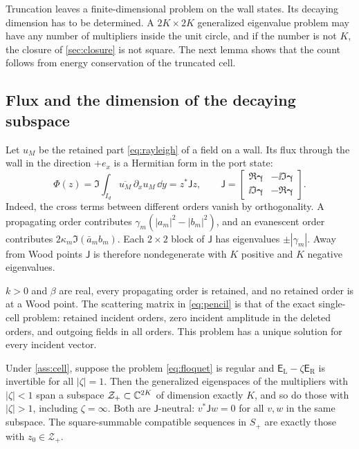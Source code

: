 Truncation leaves a finite-dimensional problem on the wall states. Its
decaying dimension has to be determined. A $2K\times2K$
generalized eigenvalue problem may have any number of multipliers inside the unit circle, and if the number is
not $K$, the closure of \cref{sec:closure} is not square. The next lemma
shows that the count follows from energy conservation of the truncated cell.

\subsection{Flux and the dimension of the decaying subspace}\label{sec:flux}
Let $u_M$ be the retained part \eqref{eq:rayleigh} of a field on a wall. Its
flux through the wall in the direction $+e_x$ is a Hermitian form in the
port state:
\begin{equation}\label{eq:flux}
  \Phi(z)=\Im\int_{I_d}\overline{u_M}\,\partial_xu_M\,\dd y=z^*\mathsf J z,
  \qquad
  \mathsf J=\begin{bmatrix}\Re\boldsymbol\gamma&-\ii\Im\boldsymbol\gamma\\
     \ii\Im\boldsymbol\gamma&-\Re\boldsymbol\gamma\end{bmatrix}.
\end{equation}
Indeed, the cross terms between different orders vanish by orthogonality. A
propagating order contributes $\gamma_m(|a_m|^2-|b_m|^2)$, and an evanescent
order contributes $2\kappa_m\Im(\bar a_mb_m)$. Each $2\times2$ block of
$\mathsf J$ has eigenvalues $\pm|\gamma_m|$. Away from Wood points
$\mathsf J$ is therefore nondegenerate with $K$ positive and $K$ negative
eigenvalues.

\begin{assumption}\label{ass:cell}
$k>0$ and $\beta$ are real, every propagating order is retained, and no
retained order is at a Wood point. The scattering matrix in
\eqref{eq:pencil} is that of the exact single-cell problem: retained incident
orders, zero incident amplitude in the deleted orders, and outgoing fields in
all orders. This problem has a unique solution for every incident vector.
\end{assumption}

\begin{lemma}\label{lem:dimension}
Under \cref{ass:cell}, suppose the problem \eqref{eq:floquet} is regular and
$\mathsf E_{\mathrm L}-\zeta\mathsf E_{\mathrm R}$ is invertible for all $|\zeta|=1$.
Then the generalized eigenspaces of the multipliers with $|\zeta|<1$ span a
subspace $\mathcal Z_+\subset\mathbb{C}^{2K}$ of dimension exactly $K$, and so do
those with $|\zeta|>1$, including $\zeta=\infty$. Both are $\mathsf J$-neutral:
$v^*\mathsf Jw=0$ for all $v,w$ in the same subspace. The square-summable
compatible sequences in $S_+$ are exactly those with $z_0\in\mathcal Z_+$.
\end{lemma}

